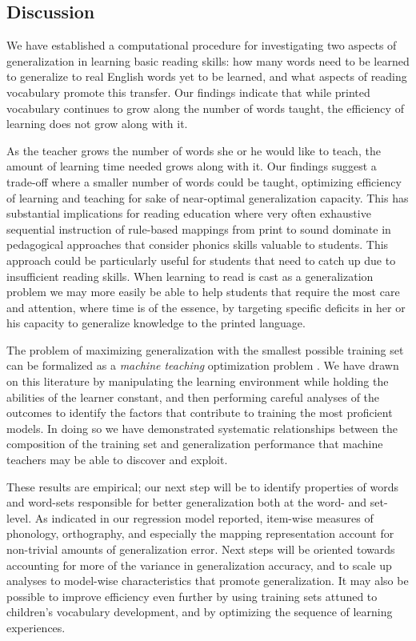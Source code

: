 \documentclass[10pt,letterpaper]{article}
\begin{document}
\subsection{Discussion}
We have established a computational procedure for investigating two aspects of generalization in learning basic reading skills: how many words need to be learned to generalize to real English words yet to be learned, and what aspects of reading vocabulary promote this transfer.  Our findings indicate that while printed vocabulary continues to grow along the number of words taught, the efficiency of learning does not grow along with it.

As the teacher grows the number of words she or he would like to teach, the amount of learning time needed grows along with it. Our findings suggest a trade-off where a smaller number of words could be taught, optimizing efficiency of learning and teaching for sake of near-optimal generalization capacity. This has substantial implications for reading education where very often exhaustive sequential instruction of rule-based mappings from print to sound dominate in pedagogical approaches that consider phonics skills valuable to students. This approach could be particularly useful for students that need to catch up due to insufficient reading skills. When learning to read is cast as a generalization problem we may more easily be able to help students that require the most care and attention, where time is of the essence, by targeting specific deficits in her or his capacity to generalize knowledge to the printed language.

The problem of maximizing generalization with the smallest possible training set can be formalized as a \emph{machine teaching} optimization problem \cite{Zhu2015}. We have drawn on this literature by manipulating the learning environment while holding the abilities of the learner constant, and then performing careful analyses of the outcomes to identify the factors that contribute to training the most proficient models. In doing so we have demonstrated systematic relationships between the composition of the training set and generalization performance that machine teachers may be able to discover and exploit. 

These results are empirical; our next step will be to identify properties of words and word-sets responsible for better generalization both at the word- and set-level. As indicated in our regression model reported, item-wise measures of phonology, orthography, and especially the mapping representation account for non-trivial amounts of generalization error. Next steps will be oriented towards accounting for more of the variance in generalization accuracy, and to scale up analyses to model-wise characteristics that promote generalization. It may also be possible to improve efficiency even further by using training sets attuned to children's vocabulary development, and by optimizing the sequence of learning experiences.
\end{document}
